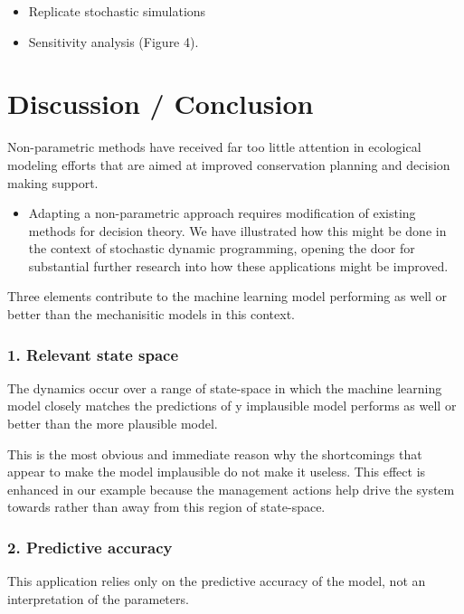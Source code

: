 \documentclass[author-year, review]{elsarticle} %
\begin{document}
\begin{itemize}
\itemsep1pt\parskip0pt
\item
  Replicate stochastic simulations
\item
  Sensitivity analysis (Figure 4).
\end{itemize}

\section{Discussion / Conclusion}

Non-parametric methods have received far too little attention in
ecological modeling efforts that are aimed at improved conservation
planning and decision making support.

\begin{itemize}
\itemsep1pt\parskip0pt
\item
  Adapting a non-parametric approach requires modification of existing
  methods for decision theory. We have illustrated how this might be
  done in the context of stochastic dynamic programming, opening the
  door for substantial further research into how these applications
  might be improved.
\end{itemize}

Three elements contribute to the machine learning model performing as
well or better than the mechanisitic models in this context.

\subsubsection{1. Relevant state space}

The dynamics occur over a range of state-space in which the machine
learning model closely matches the predictions of y implausible model
performs as well or better than the more plausible model.

This is the most obvious and immediate reason why the shortcomings that
appear to make the model implausible do not make it useless. This effect
is enhanced in our example because the management actions help drive the
system towards rather than away from this region of state-space.

\subsubsection{2. Predictive accuracy}

This application relies only on the predictive accuracy of the model,
not an interpretation of the parameters.
\end{document}
